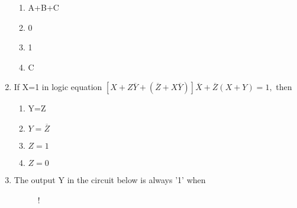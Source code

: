 \documentclass[journal,12pt,twocolumn]{IEEEtran}
\begin{document}
\begin{enumerate}
%

   \begin{enumerate}
     \item A+B+C
      \item 0
      \item 1
      \item C
    \end{enumerate} 
    
     \item If X=1 in logic equation $[X+Z{\overline{Y}+(\overline{Z}+X\overline{Y})}]{\overline{X}+\overline{Z}(X+Y)}=1,$ then
    \begin{enumerate}
      \item Y=Z
      \item $Y=\overline{Z}$
      \item $Z=1$
      \item $Z=0$
    \end{enumerate}
     \item The output Y in the circuit below is always '1' when
\begin{figure}[!h]
\centering
\resizebox {\columnwidth} {!} {

}
\caption{}
\end{figure}

%
     
  

\end{enumerate}
\end{document}
